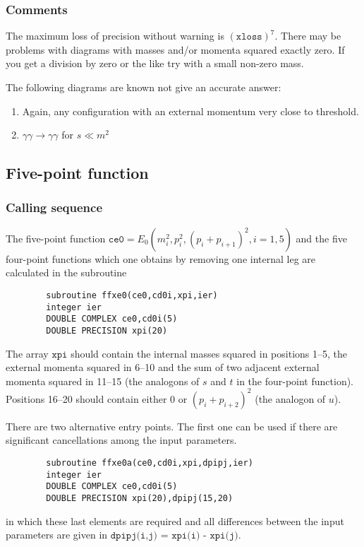 \documentclass[twoside,12pt]{report}
\def\Code#1{\ensuremath{\texttt{#1}}}
\begin{document}
\begin{appendix}
\subsubsection{Comments}

The maximum loss of precision without warning is $(\Code{xloss})^7$.  
There may be problems with diagrams with masses and/or momenta squared 
exactly zero.  If you get a division by zero or the like try with a 
small non-zero mass.

The following diagrams are known not give an accurate answer:
\begin{enumerate}
\item Again, any configuration with an external momentum very close to 
threshold.
\item $\gamma\gamma \to \gamma\gamma$ for $s \ll m^2$
\end{enumerate}

\subsection{Five-point function}

\subsubsection{Calling sequence}

The five-point function $\Code{ce0} = E_0(m_i^2,p_i^2,(p_i+p_{i+1})^2,i=1,
5)$ and the five four-point functions which one obtains by removing one 
internal leg are calculated in the subroutine
\begin{verbatim}
        subroutine ffxe0(ce0,cd0i,xpi,ier)  
        integer ier
        DOUBLE COMPLEX ce0,cd0i(5)
        DOUBLE PRECISION xpi(20)
\end{verbatim}
The array \Code{xpi} should contain the internal masses squared in positions 
1--5, the external momenta squared in 6--10 and the sum of two adjacent 
external momenta squared in 11--15 (the analogons of $s$ and $t$ in the 
four-point function).  Positions 16--20 should contain either 0 or 
$(p_i+p_{i+2})^2$ (the analogon of $u$).

There are two alternative entry points.  The first one can be used if there 
are significant cancellations among the input parameters.
\begin{verbatim}
        subroutine ffxe0a(ce0,cd0i,xpi,dpipj,ier)
        integer ier
        DOUBLE COMPLEX ce0,cd0i(5)
        DOUBLE PRECISION xpi(20),dpipj(15,20)
\end{verbatim}
in which these last elements are required and all differences between the 
input parameters are given in \Code{dpipj(i,j) = xpi(i) - xpi(j)}.


\end{appendix}
\end{document}
